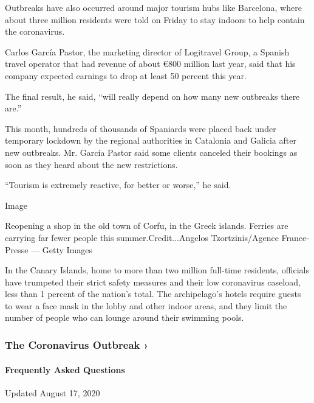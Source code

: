 Outbreaks have also occurred around major tourism hubs like Barcelona,
where about three million residents were told on Friday to stay indoors
to help contain the coronavirus.

Carlos García Pastor, the marketing director of Logitravel Group, a
Spanish travel operator that had revenue of about €800 million last
year, said that his company expected earnings to drop at least 50
percent this year.

The final result, he said, ``will really depend on how many new
outbreaks there are.''

This month, hundreds of thousands of Spaniards were placed back under
temporary lockdown by the regional authorities in Catalonia and Galicia
after new outbreaks. Mr. García Pastor said some clients canceled their
bookings as soon as they heard about the new restrictions.

``Tourism is extremely reactive, for better or worse,'' he said.

Image

Reopening a shop in the old town of Corfu, in the Greek islands. Ferries
are carrying far fewer people this summer.Credit...Angelos
Tzortzinis/Agence France-Presse --- Getty Images

In the Canary Islands, home to more than two million full-time
residents, officials have trumpeted their strict safety measures and
their low coronavirus caseload, less than 1 percent of the nation's
total. The archipelago's hotels require guests to wear a face mask in
the lobby and other indoor areas, and they limit the number of people
who can lounge around their swimming pools.

\href{https://www.nytimes3xbfgragh.onion/news-event/coronavirus?action=click\&pgtype=Article\&state=default\&region=MAIN_CONTENT_3\&context=storylines_faq}{}

\hypertarget{the-coronavirus-outbreak-}{%
\subsubsection{The Coronavirus Outbreak
›}\label{the-coronavirus-outbreak-}}

\hypertarget{frequently-asked-questions}{%
\paragraph{Frequently Asked
Questions}\label{frequently-asked-questions}}

Updated August 17, 2020

